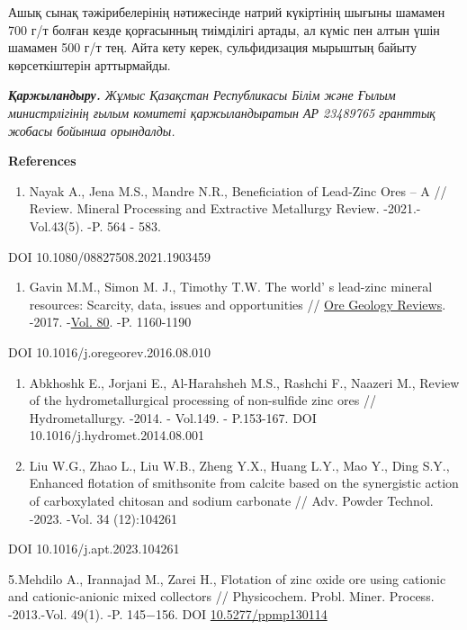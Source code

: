 {Ашық сынақ тәжірибелерінің нәтижесінде натрий күкіртінің шығыны шамамен
700 г/т болған кезде қорғасынның тиімділігі артады, ал күміс пен алтын
үшін шамамен 500 г/т тең. Айта кету керек, сульфидизация мырыштың байыту
көрсеткіштерін арттырмайды.

\emph{{\bfseries Қаржыландыру.} Жұмыс Қазақстан Республикасы Білім және
Ғылым министрлігінің ғылым комитеті қаржыландыратын АР 23489765 гранттық
жобасы бойынша орындалды.}

{\bfseries References}

\begin{enumerate}
\def\labelenumi{\arabic{enumi}.}
\item
  Nayak A., Jena M.S., Mandre N.R., Beneficiation of Lead-Zinc Ores -- A
  // Review. Mineral Processing and Extractive Metallurgy Review.
  -2021.-Vol.43(5). -P. 564 - 583.
\end{enumerate}

DOI 10.1080/08827508.2021.1903459

\begin{enumerate}
\def\labelenumi{\arabic{enumi}.}
\setcounter{enumi}{1}
\item
  Gavin M.M., Simon M. J., Timothy T.W. The world' s
  lead-zinc mineral resources: Scarcity, data, issues and opportunities
  //
  \href{https://www.sciencedirect.com/journal/ore-geology-reviews}{Ore
  Geology Reviews}. -2017.
  -\href{file:///C:/Users/admin/Desktop/Вестник\%20КазУТБ/Vol.\%2080}{Vol.
  80}. -P. 1160-1190
\end{enumerate}

DOI 10.1016/j.oregeorev.2016.08.010

\begin{enumerate}
\def\labelenumi{\arabic{enumi}.}
\setcounter{enumi}{2}
\item
  Abkhoshk E., Jorjani E., Al-Harahsheh M.S., Rashchi F., Naazeri M.,
  Review of the hydrometallurgical processing of non-sulfide zinc ores
  // Hydrometallurgy. -2014. - Vol.149. - P.153-167. DOI
  10.1016/j.hydromet.2014.08.001
\item
  Liu W.G., Zhao L., Liu W.B., Zheng Y.X., Huang L.Y., Mao Y., Ding
  S.Y., Enhanced flotation of smithsonite from calcite based on the
  synergistic action of carboxylated chitosan and sodium carbonate //
  Adv. Powder Technol. -2023. -Vol. 34 (12):104261
\end{enumerate}

DOI 10.1016/j.apt.2023.104261

5.Mehdilo A., Irannajad M., Zarei H., Flotation of zinc oxide ore using
cationic and cationic-anionic mixed collectors // Physicochem. Probl.
Miner. Process. -2013.-Vol. 49(1). -P. 145−156. DOI
\href{http://dx.doi.org/10.5277/ppmp130114}{10.5277/ppmp130114}

}
